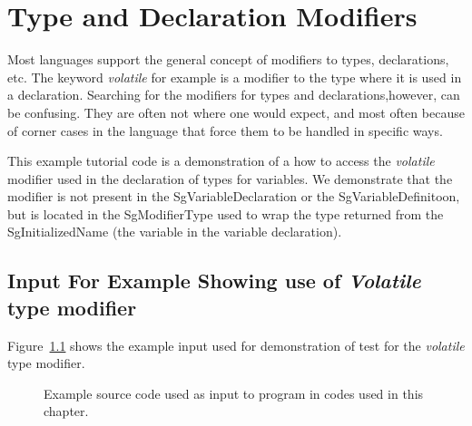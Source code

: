 \chapter{Type and Declaration Modifiers}

   Most languages support the general concept of modifiers to
types, declarations, etc.  The keyword {\em volatile} for
example is a modifier to the type where it is used in a 
declaration.  Searching for the modifiers for types and 
declarations,however, can be confusing.  They are often not
where one would expect, and most often because of corner
cases in the language that force them to be handled in specific 
ways.

   This example tutorial code is a demonstration of a how to access the
{\em volatile} modifier used in the declaration of types for variables.
We demonstrate that the modifier is not present in the SgVariableDeclaration
or the SgVariableDefinitoon, but is located in the SgModifierType used
to wrap the type returned from the SgInitializedName (the variable in the
variable declaration).

\section{Input For Example Showing use of {\em Volatile} type modifier}

   Figure~\ref{Tutorial:exampleInputCode_volatileTypeModifier}
shows the example input used for demonstration of test for the {\em volatile} 
type modifier.

\begin{figure}[!h]
{\indent
{\mySmallFontSize

\begin{latexonly}
   
\end{latexonly}

\begin{htmlonly}
   
\end{htmlonly}

}
}
\caption{Example source code used as input to program in codes used in this chapter.}
\label{Tutorial:exampleInputCode_volatileTypeModifier}
\end{figure}


